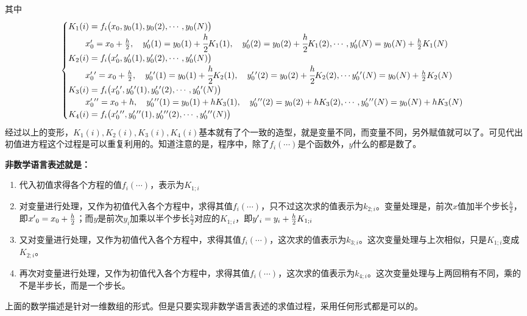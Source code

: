 其中
$$\begin{cases}
K_{1}(i)=f_i\big(x_0,y_{0}(1),y_{0}(2),\cdots,y_{0}(N)\big)\\
\qquad x_0\rq{}=x_0+\frac{h}{2} ,\quad y_{0}\rq{}(1)= y_{0}(1)+\cfrac{h}{2}K_{1}(1),
\quad   y_{0}\rq{}(2)=y_{0}(2)+\cfrac{h}{2}K_{1}(2), \cdots,y_{0}\rq{}(N)=y_{0}(N)+\frac{h}{2}K_{1}(N)\\
K_{2}(i)=f_i\big(x_0\rq{},y_{0}\rq{}(1),y_{0}\rq{}(2),\cdots,y_{0}\rq{}(N)\big)\\
\qquad x_0\rq{}\rq{}=x_0+\frac{h}{2} ,\quad y_{0}\rq{}\rq{}(1)= y_{0}(1)+\cfrac{h}{2}K_{2}(1),
\quad   y_{0}\rq{}\rq{}(2)=y_{0}(2)+\cfrac{h}{2}K_{2}(2),\cdots y_{0}\rq{}\rq{}(N)=y_{0}(N)+\frac{h}{2}K_{2}(N)\\
K_{3}(i)=f_i\big(x_0\rq{}\rq{},y_{0}\rq{}\rq{}(1),y_{0}\rq{}\rq{}(2),\cdots,y_{0}\rq{}\rq{}(N)\big)\\
\qquad x_0\rq{}\rq{}\rq{}=x_0+h ,\quad y_{0}\rq{}\rq{}\rq{}(1)= y_{0}(1)+hK_{3}(1),
\quad   y_{0}\rq{}\rq{}\rq{}(2)=y_{0}(2)+hK_{3}(2),\cdots, y_{0}\rq{}\rq{}\rq{}(N)=y_{0}(N)+hK_{3}(N)\\
K_{4}(i)=f_i\big(x_0\rq{}\rq{}\rq{},y_{0}\rq{}\rq{}\rq{}(1),y_{0}\rq{}\rq{}\rq{}(2),\cdots,y_{0}\rq{}\rq{}\rq{}(N)\big)\\
\end{cases}
$$
经过以上的变形，$K_1(i),K_2(i),K_3(i),K_4(i)$基本就有了个一致的造型，就是变量不同，而变量不同，另外赋值就可以了。可见代出初值进方程这个过程是可以重复利用的。知道注意的是，程序中，除了$f_i(\cdots)$是个函数外，$y$什么的都是数了。

\hypertarget{program}{\textbf{非数学语言表述就是：}}
\begin{enumerate}
\item 代入初值求得各个方程的值$f_i(\cdots)$，表示为$K_{1;i}$
\item 对变量进行处理，又作为初值代入各个方程中，求得其值$f_i(\cdots)$，只不过这次求的值表示为$k_{2;i}$。变量处理是，前次$x$值加半个步长$\frac{h}{2}$，即$x\rq{}_0=x_0+\frac{h}{2}$；而$y$是前次$y_i$加乘以半个步长$\frac{h}{2}$对应的$K_{1;i}$，即$y\rq{}_i=y_i+\frac{h}{2}K_{1;i}$
\item 又对变量进行处理，又作为初值代入各个方程中，求得其值$f_i(\cdots)$，这次求的值表示为$k_{3;i}$。这次变量处理与上次相似，只是$K_{1;i}$变成$K_{2;i}$。
\item 再次对变量进行处理，又作为初值代入各个方程中，求得其值$f_i(\cdots)$，这次求的值表示为$k_{4;i}$。这次变量处理与上两回稍有不同，乘的不是半步长，而是一个步长。
\end{enumerate}
上面的数学描述是针对一维数组的形式。但是只要实现非数学语言表述的求值过程，采用任何形式都是可以的。


